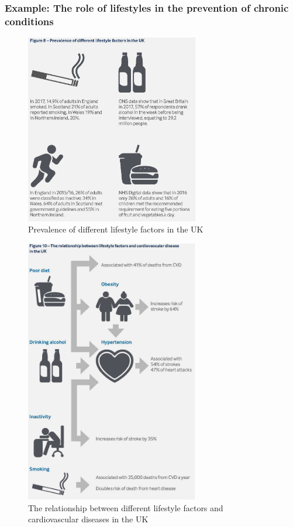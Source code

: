         \subsubsection{Example: The role of lifestyles in the prevention of chronic conditions}         
        \begin{figure}[H]%
                \centering
                \includegraphics[width=3in]{images/ch3/15.png}
                \caption{Prevalence of different lifestyle factors in the UK}
                \label{fig:label}
            \end{figure} 
        \begin{figure}[H]%
                \centering
                \includegraphics[width=3in]{images/ch3/16.png}
                \caption{The relationship between different lifestyle factors and cardiovascular diseases in the UK}
                \label{fig:label}
            \end{figure} 

